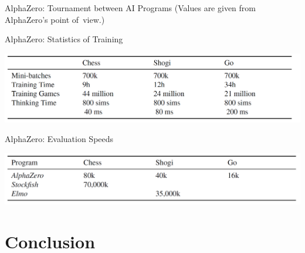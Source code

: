 \documentclass{beamer}
\begin{document}
{\begin{frame}{AlphaZero: Tournament between AI Programs}
      {\tiny (Values are given from AlphaZero's point of~view.)}
    \end{frame}

    \begin{frame}{AlphaZero: Statistics of Training}
      \begin{center}
        \includegraphics[width=\textwidth]{../img/AlphaZero-paper/statistics-of-AlphaZero-training.png}
      \end{center}
    \end{frame}

    \begin{frame}{AlphaZero: Evaluation Speeds}
      \begin{center}
        \includegraphics[width=\textwidth]{../img/AlphaZero-paper/evaluation-speed-of-AlphaZero.png}
      \end{center}
    \end{frame}
  }

  \section{Conclusion}
\end{document}
